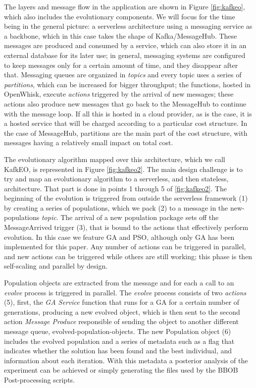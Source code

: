 \documentclass[sigconf]{acmart}
\begin{document}
The layers and message flow in the application are shown in Figure
\ref{fig:kafkeo}, which also includes the evolutionary components. We
will focus for the time being in the general picture: a serverless
architecture using  a messaging service as a backbone, which in this case
takes the shape of Kafka/MessageHub. These messages are produced and
consumed by a service, which can also store it in an external database
for its later use; in general, messaging systems are configured to
keep messages only for a certain amount of time, and they disappear
after that. Messaging queues are organized in {\em topics} and every
topic uses a series of {\em partitions}, which can be increased for
bigger throughput; the
functions, hosted in OpenWhisk, execute {\em actions} triggered by the
arrival of new messages; these actions also produce new messages that
go back to the MessageHub to continue with the message loop. If all
this is hosted in a cloud provider, as is the case, it is a hosted
service that will be charged according to a particular cost
structure. In the case of MessageHub, partitions are the main part of
the cost structure, with messages having a relatively small impact on
total cost. 

The evolutionary algorithm mapped over this architecture, which we
call KafkEO, is represented in Figure \ref{fig:kafkeo2}. The main
design challenge is to try and map an evolutionary algorithm to a
serverless, and then stateless, architecture. That part is done in
points 1 through 5 of  \ref{fig:kafkeo2}. The beginning of the
evolution is triggered from outside the serverless framework (1) by
creating a series of populations, which we pack (2) to a message in the
{\sf new-populations} {\em topic}. The arrival of a new population
package sets off the {\sf MessageArrived} trigger (3), that is bound to
the actions that effectively perform evolution. In this case we
feature GA and PSO, although only GA has been implemented for this
paper. Any number of actions can be triggered in parallel, and new
actions can be triggered while others are still working; this phase is
then self-scaling and parallel by design.

Population objects are extracted from the message and for each a call to 
an {\em evolve} process is triggered in parallel. The {\em evolve} process 
consists of two {\em actions} (5), first, the {\em GA Service} function that 
runs for a GA for a certain number of generations, producing a new evolved 
object, which is then sent to  the second action {\em Message Produce}
 responsible of sending the object to another different message queue, 
 {\sf evolved-population-objects}.  The new Population object (6) includes 
 the evolved population and a series of metadata such as a flag that indicates
whether the solution has been found and the best individual, and information 
about each iteration. With this metadata a posterior analysis of the experiment
can be achieved or simply generating the files used by the BBOB Post-processing scripts. 
\end{document}
